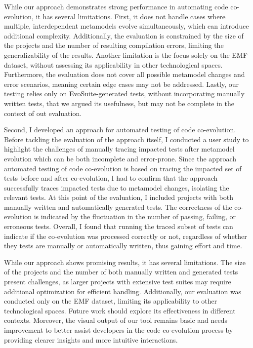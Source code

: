 While our approach demonstrates strong performance in automating code co-evolution, it has several limitations. First, it does not handle cases where multiple, interdependent metamodels evolve simultaneously, which can introduce additional complexity. Additionally, the evaluation is constrained by the size of the projects and the number of resulting compilation errors, limiting the generalizability of the results. Another limitation is the focus solely on the EMF dataset, without assessing its applicability in other technological spaces. Furthermore, the evaluation does not cover all possible metamodel changes and error scenarios, meaning certain edge cases may not be addressed. Lastly, our testing relies only on EvoSuite-generated tests, without incorporating manually written tests, that we argued its usefulness, but may not be complete in the context of out evaluation.



Second, I developed an approach for automated testing of code co-evolution. 
Before tackling the evaluation of the approach itself, I conducted a user study to highlight the challenges of manually tracing impacted tests after metamodel evolution which can be both incomplete and error-prone. Since the approach automated testing of code co-evolution is based on tracing the impacted set of tests before and after co-evolution, I had to confirm that the approach successfully traces impacted tests due to metamodel changes, isolating the relevant tests. At this point of the evaluation, I included projects with both manually written and automatically generated tests. The correctness of the co-evolution is indicated by the fluctuation in the number of passing, failing, or erroneous tests. Overall, I found that running the traced subset of tests can indicate if the co-evolution was processed correctly or not, regardless of whether they tests are manually or automatically written, thus gaining effort and time.

While our approach shows promising results, it has several limitations. The size of the projects and the number of both manually written and generated tests present challenges, as larger projects with extensive test suites may require additional optimization for efficient handling. Additionally, our evaluation was conducted only on the EMF dataset, limiting its applicability to other technological spaces. Future work should explore its effectiveness in different contexts. Moreover, the visual output of our tool remains basic and needs improvement to better assist developers in the code co-evolution process by providing clearer insights and more intuitive interactions.

